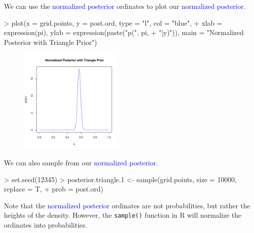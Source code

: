 \documentclass[handout]{beamer}
\begin{document}
\begin{frame}[fragile]
We can use the \textcolor{blue}{normalized posterior} ordinates to
plot our \textcolor{blue}{normalized posterior}.
\pause
\medskip
\tiny
\begin{Schunk}
\begin{Sinput}
> plot(x = grid.points, y = post.ord, type = "l", col = "blue", 
+     xlab = expression(pi), ylab = expression(paste("p(", pi, 
+         "|y)")), main = "Normalized Posterior with Triangle Prior")
\end{Sinput}
\end{Schunk}
\begin{figure}[!htp]
\begin{center}
\includegraphics[width = 2in, height = 2in]{grid-trianglepost.pdf}
\end{center}
\end{figure}
\normalsize
\end{frame}

\begin{frame}[fragile]
We can also sample from our \textcolor{blue}{normalized posterior}. 
\tiny
\medskip 
\pause
\begin{Schunk}
\begin{Sinput}
> set.seed(12345)
> posterior.triangle.1 <- sample(grid.points, size = 10000, replace = T, 
+     prob = post.ord)
\end{Sinput}
\end{Schunk}
\normalsize
\pause
\bigskip
Note that the \textcolor{blue}{normalized posterior} ordinates are not
probabilities, but rather the heights of the density.  \pause However, the
{\tt sample()} function in R will normalize the ordinates into probabilities.
\end{frame}
\end{document}
